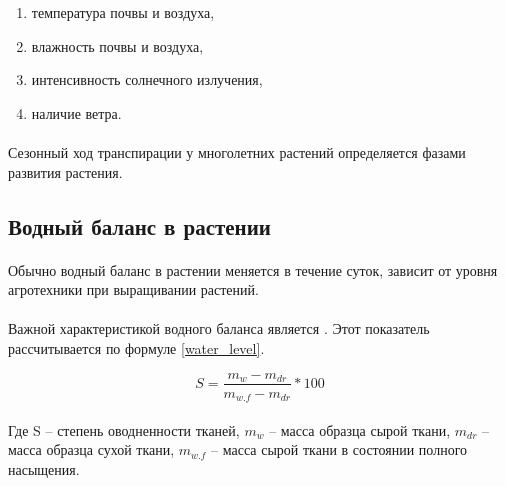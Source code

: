 \begin{enumerate}

	\item температура почвы и воздуха, 
	\item влажность почвы и воздуха, 
	\item интенсивность солнечного излучения, 
	\item наличие ветра.

\end{enumerate}

\paragraph*{}Сезонный ход транспирации у многолетних растений определяется фазами развития растения.

\subsection*{Водный баланс в растении}


\paragraph*{}Обычно водный баланс в растении меняется в течение суток, зависит от уровня агротехники при выращивании растений.

\paragraph*{}Важной характеристикой водного баланса является . Этот показатель рассчитывается по формуле \ref{water_level}.

\begin{equation}
	S = \frac{m_{w}-m_{dr}}{m_{w.f}-m_{dr}}*100
	\label{water_level}
\end{equation}

\paragraph*{}Где S -- степень оводненности тканей, $m_{w}$ -- масса образца сырой ткани, $m_{dr}$ -- масса образца сухой ткани, $m_{w.f}$ -- масса сырой ткани в состоянии полного насыщения.



